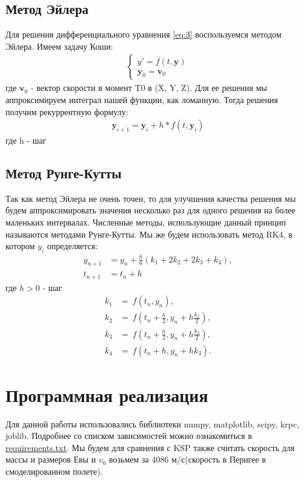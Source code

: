 \documentclass{article}
\begin{document}
    \subsection{Метод Эйлера}
    Для решения дифференциального уравнения \eqref{eq:3} воспользуемся методом Эйлера. Имеем задачу Коши:
    \begin{gather} 
        \begin{cases}
            y' = f(t, \mathbf{y}) \\
            \mathbf{y}_0 = \mathbf{v}_0
        \end{cases}
    \end{gather} где $\mathbf{v}_0$ - вектор скорости в момент T0 в (X, Y, Z).
    Для ее решения мы аппроксимируем интеграл нашей функции, как ломанную. Тогда решения получим рекуррентную формулу:
    \begin{gather} 
        \mathbf{y}_{i + 1} = \mathbf{y}_i + h * f(t, \mathbf{y}_i)
    \end{gather}
    где h - шаг
    \subsection{Метод Рунге-Кутты}
    Так как метод Эйлера не очень точен, то для улучшения качества решения мы будем аппроксимировать значения несколько раз для одного решения на более маленьких интервалах. Численные методы, использующие данный принцип называются методами Рунге-Кутты. Мы же будем использовать метод RK4, в котором $y_i$ определяется:
    \begin{equation}
    \begin{aligned}
        y_{n+1} &= y_n + \frac{h}{6}\left(k_1 + 2k_2 + 2k_3 + k_4 \right),\\
        t_{n+1} &= t_n + h 
    \end{aligned}
    \end{equation}
    где $h > 0$ - шаг
    \begin{equation}
    \begin{aligned}
     k_1 &= \ f(t_n, y_n), \\
     k_2 &= \ f\!\left(t_n + \frac{h}{2}, y_n + h \frac{k_1}{2}\right), \\ 
     k_3 &= \ f\!\left(t_n + \frac{h}{2}, y_n + h \frac{k_2}{2}\right), \\
     k_4 &= \ f\!\left(t_n + h, y_n + h k_3\right).
    \end{aligned}
    \end{equation}
    \section{Программная реализация}
    Для данной работы использовались библиотеки numpy, matplotlib, scipy, krpc, joblib. Подробнее со списком зависимостей можно ознакомиться в \href{https://github.com/xsestech/graviton/blob/master/requirements.txt}{requirements.txt}. Мы будем для сравнения с KSP также считать скорость для массы и размеров Евы и $v_0$ возьмем за 4086 м/с(скорость в Перигее в смоделированном полете).
\end{document}
